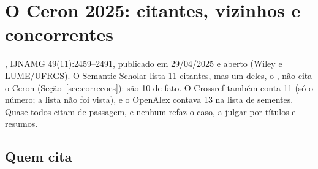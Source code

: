 \documentclass[11pt,a4paper]{article}
\begin{document}
\section{O Ceron 2025: citantes, vizinhos e concorrentes}\label{sec:ceron}
\citet{vargasceron2025}, IJNAMG 49(11):2459--2491, publicado em 29/04/2025 e aberto (Wiley e LUME/UFRGS). O Semantic
Scholar lista 11 citantes, mas um deles, o \citet{mesquita2025}, não cita o Ceron (Seção~\ref{sec:correcoes}): são 10
de fato. O Crossref também conta 11 (só o número; a lista não foi vista), e o OpenAlex contava 13 na lista de sementes.
Quase todos citam de passagem, e nenhum refaz o caso, a julgar por títulos e resumos.

\subsection{Quem cita}
\end{document}
